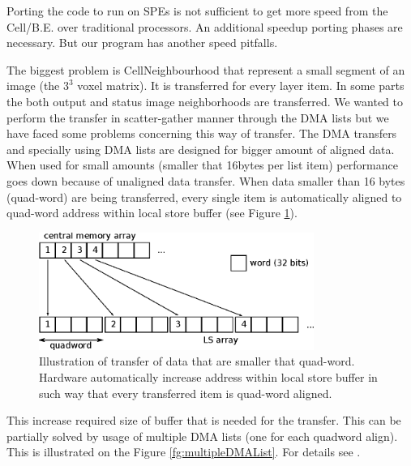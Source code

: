\par
Porting the code to run on SPEs is not sufficient to get more speed from the Cell/B.E. over traditional processors.
An additional speedup porting phases are necessary.
But our program has another speed pitfalls.

\par
The biggest problem is CellNeighbourhood that represent a small segment of an image (the $3^3$ voxel matrix).
It is transferred for every layer item.
In some parts the both output and status image neighborhoods are transferred.
We wanted to perform the transfer in scatter-gather manner through the DMA lists but we have faced some problems concerning this way of transfer.
The DMA transfers and specially using DMA lists are designed for bigger amount of aligned data.
When used for small amounts (smaller that 16bytes per list item) performance goes down because of unaligned data transfer.
When data smaller than 16 bytes (quad-word) are being transferred, every single item is automatically aligned to quad-word address within local store buffer (see Figure \ref{fg:automaticAlignOfSmallData}).

\begin{figure}
    \centering
    \includegraphics[width=0.8\textwidth]{data/automaticAlignOfSmallData}
    \caption[Automatic align of small data]
{
  Illustration of transfer of data that are smaller that quad-word.
  Hardware automatically increase address within local store buffer in such way that every transferred item is quad-word aligned.
}
    \label{fg:automaticAlignOfSmallData}
\end{figure}

This increase required size of buffer that is needed for the transfer.
This can be partially solved by usage of multiple DMA lists (one for each quadword align).
This is illustrated on the Figure \ref{fg:multipleDMAList}.
For details see \cite{DMAListIssues}.

